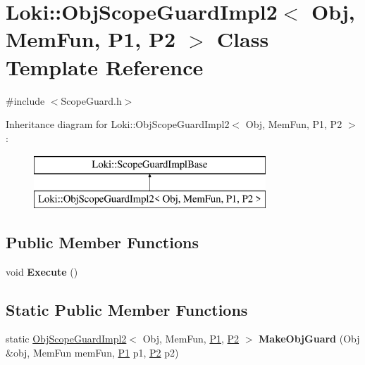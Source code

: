 \hypertarget{classLoki_1_1ObjScopeGuardImpl2}{}\section{Loki\+:\+:Obj\+Scope\+Guard\+Impl2$<$ Obj, Mem\+Fun, P1, P2 $>$ Class Template Reference}
\label{classLoki_1_1ObjScopeGuardImpl2}


{\ttfamily \#include $<$Scope\+Guard.\+h$>$}

Inheritance diagram for Loki\+:\+:Obj\+Scope\+Guard\+Impl2$<$ Obj, Mem\+Fun, P1, P2 $>$\+:\begin{figure}[H]
\begin{center}
\leavevmode
\includegraphics[height=2.000000cm]{classLoki_1_1ObjScopeGuardImpl2}
\end{center}
\end{figure}
\subsection*{Public Member Functions}
\begin{DoxyCompactItemize}
\item 
\hypertarget{classLoki_1_1ObjScopeGuardImpl2_a230b58467ee8ba4cbeca0a1ae21d266d}{}void {\bfseries Execute} ()\label{classLoki_1_1ObjScopeGuardImpl2_a230b58467ee8ba4cbeca0a1ae21d266d}

\end{DoxyCompactItemize}
\subsection*{Static Public Member Functions}
\begin{DoxyCompactItemize}
\item 
\hypertarget{classLoki_1_1ObjScopeGuardImpl2_ace2cb0ee0f7d2d6829438a9950139031}{}static \hyperlink{classLoki_1_1ObjScopeGuardImpl2}{Obj\+Scope\+Guard\+Impl2}$<$ Obj, Mem\+Fun, \hyperlink{structP1}{P1}, \hyperlink{structP2}{P2} $>$ {\bfseries Make\+Obj\+Guard} (Obj \&obj, Mem\+Fun mem\+Fun, \hyperlink{structP1}{P1} p1, \hyperlink{structP2}{P2} p2)\label{classLoki_1_1ObjScopeGuardImpl2_ace2cb0ee0f7d2d6829438a9950139031}

\end{DoxyCompactItemize}
